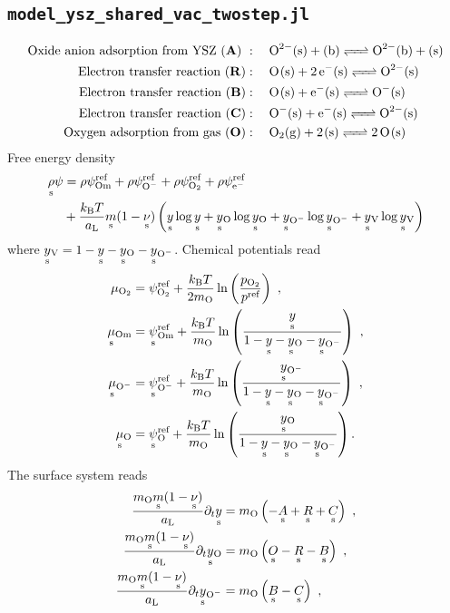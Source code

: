 \documentclass{article}
\numberwithin{equation}{section}
\newcommand{\us}[1]{\underset{\textrm{s}}{#1}{}}
\def\kB{k_\mathrm{B}}
\def\Ox{\mathrm{O}}
\newcommand{\Omin}{{\ce{O-}}}
\def\Om{\mathrm{Om}}
\newcommand{\OO}{{\ce{O2}}}
\def\eM{\mathrm{e^-}}
\def\aL{a_\mathrm{L}}
\def\ys{\us y}
\newcommand{\ysV}{\us y_{\textrm{V}}}
\newcommand{\yOmin}{\us y_{\ce{O-}}}
\def\yOs{\us y_\textrm{O}}
\def\REF{\textrm{ref}}
\begin{document}
\subsection{\texttt{model\_ysz\_shared\_vac\_twostep.jl}}
\begin{subequations}
 \begin{align}
\text{Oxide anion adsorption from YSZ (\textbf{A})}  \ &: \quad 
\ce{O^{2-}(s) + (b) <=> O^{2-}(b) + (s)}
\\
\text{Electron transfer reaction (\textbf{R})}   &: \quad 
\ce{O(s) +  2e^-(s) <=> O^{2-}(s)}
\\
\text{Electron transfer reaction (\textbf{B})}   &: \quad 
\ce{O(s) +  e^-(s) <=> O^{-}(s)}
\\
\text{Electron transfer reaction (\textbf{C})}  &: \quad 
\ce{O^-(s) +  e^-(s) <=> O^{2-}(s)}
\\
\text{Oxygen adsorption from gas (\textbf{O})}   &: \quad 
\ce{O2(g) + 2(s) <=> 2O(s)}
\end{align}
\end{subequations}
Free energy density
\begin{align}
    \us\rho\psi &= 
              \rho\psi^\REF_\Om
            + \rho\psi^\REF_\Omin
            + \rho\psi^\REF_\OO
            + \rho\psi^\REF_\eM\nonumber
            \\
            &+ \frac{\kB T}{\aL}\us m(1-\us\nu) 
            \left( 
                \ys   \log {\ys} 
                +\yOs  \log {\yOs}
                +\yOmin  \log {\yOmin}
                +\ysV  \log {\ysV}
            \right)
    \label{}
\end{align}
where $\ysV = 1 - \ys - \yOs - \yOmin$.
Chemical potentials read
\begin{subequations}
\begin{align}
\mu_{\OO} &= \psi_{\OO}^\REF + \frac{\kB T}{2 m_\Ox}\ln 
\left( 
    \frac{p_\OO}{p^\REF} 
\right)~,
\\
\us\mu_{\Om} 
&= 
\us \psi_{\Om}^\REF 
+ 
\frac{\kB T}{m_\Ox} \ln 
\left(  
	\frac{\ys}{1-\ys - \yOs- \yOmin}
\right)~,
\\
\us\mu_{\Omin} 
&= 
\us \psi_{\Omin}^\REF 
+ 
\frac{\kB T}{m_\Ox} \ln 
\left(  
	\frac{\yOmin}{1-\ys - \yOs - \yOmin}
\right)~,
\\
\us\mu_{\Ox} 
&= 
\us \psi_{\Ox}^\REF 
+ 
\frac{\kB T}{m_\Ox} \ln 
\left(  
	\frac{\yOs}{1-\ys - \yOs- \yOmin}
\right).
\end{align}
\end{subequations}
The surface system reads
\begin{subequations}
\begin{align}
 \frac{m_\Ox \us m (1- \us \nu)}{\aL}\partial_t \ys
&=
m_\Ox
\left(
    - \us A
    +\us R
    +\us C
\right)~,
\\
 \frac{m_\Ox \us m (1- \us \nu)}{\aL}\partial_t \yOs
&=
m_\Ox
\left(
      \us O
     -\us R 
     -\us B
\right)~,
\\
\frac{m_\Ox \us m (1- \us \nu)}{\aL}\partial_t \yOmin
&=
m_\Ox 
\left(
    \us B 
   -\us C
\right)~,
\end{align}
\end{subequations}
\end{document}
